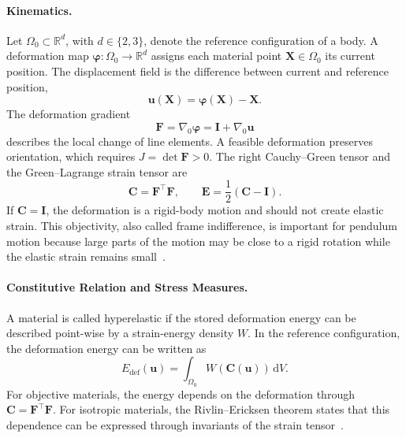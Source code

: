 \paragraph{Kinematics.}
Let $\Omega_0 \subset \mathbb{R}^d$, with $d \in \{2,3\}$, denote the reference configuration of a body.
A deformation map $\boldsymbol{\varphi} : \Omega_0 \to \mathbb{R}^d$ assigns each material point $\mathbf{X} \in \Omega_0$ its current position.
The displacement field is the difference between current and reference position,
\begin{equation}
    \mathbf{u}(\mathbf{X}) = \boldsymbol{\varphi}(\mathbf{X}) - \mathbf{X}.
\end{equation}
The deformation gradient
\begin{equation}
    \mathbf{F} = \nabla_0 \boldsymbol{\varphi}
    = \mathbf{I} + \nabla_0 \mathbf{u}
    \label{eq:fem_deformation_gradient}
\end{equation}
describes the local change of line elements.
A feasible deformation preserves orientation, which requires $J = \det \mathbf{F} > 0$.
The right Cauchy--Green tensor and the Green--Lagrange strain tensor are
\begin{equation}
    \mathbf{C} = \mathbf{F}^{\top}\mathbf{F},
    \qquad
    \mathbf{E} = \frac{1}{2}(\mathbf{C}-\mathbf{I}).
    \label{eq:fem_strain_measures}
\end{equation}
If $\mathbf{C} = \mathbf{I}$, the deformation is a rigid-body motion and should not create elastic strain.
This objectivity, also called frame indifference, is important for pendulum motion because large parts of the motion may be close to a rigid rotation while the elastic strain remains small~\cite{braess_finite_2007,kruzik_mathematical_2019}.

\paragraph{Constitutive Relation and Stress Measures.}
A material is called hyperelastic if the stored deformation energy can be described point-wise by a strain-energy density $W$.
In the reference configuration, the deformation energy can be written as
\begin{equation}
    E_{\mathrm{def}}(\mathbf{u})
    =
    \int_{\Omega_0} W(\mathbf{C}(\mathbf{u}))\,\mathrm{d}V .
    \label{eq:fem_deformation_energy}
\end{equation}
For objective materials, the energy depends on the deformation through $\mathbf{C}=\mathbf{F}^{\top}\mathbf{F}$.
For isotropic materials, the Rivlin--Ericksen theorem states that this dependence can be expressed through invariants of the strain tensor~\cite{braess_finite_2007,kruzik_mathematical_2019}.

